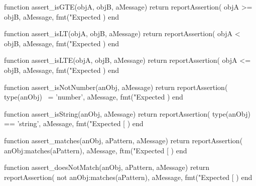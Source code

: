 \startTestSuite[title=assert_isGTE]

\startLuaCode
function assert_isGTE(objA, objB, aMessage)
  return reportAssertion(
    objA >= objB,
    aMessage,
    fmt("Expected %
  )
end
\stopLuaCode

\stopTestSuite

\startTestSuite[title=assert_isLT]

\startLuaCode
function assert_isLT(objA, objB, aMessage)
  return reportAssertion(
    objA < objB,
    aMessage,
    fmt("Expected %
  )
end
\stopLuaCode

\stopTestSuite

\startTestSuite[title=assert_isLTE]

\startLuaCode
function assert_isLTE(objA, objB, aMessage)
  return reportAssertion(
    objA <= objB,
    aMessage,
    fmt("Expected %
  )
end
\stopLuaCode


\stopTestSuite

\startTestSuite[title=assert_isNotNumber]

\startLuaCode
function assert_isNotNumber(anObj, aMessage)
  return reportAssertion(
    type(anObj) ~= 'number',
    aMessage,
    fmt("Expected %
  )
end
\stopLuaCode

\stopTestSuite

\startTestSuite[title=assert_isString]

\startLuaCode
function assert_isString(anObj, aMessage)
  return reportAssertion(
    type(anObj) == 'string',
    aMessage,
    fmt("Expected [%
  )
end
\stopLuaCode

\stopTestSuite

\startTestSuite[title=assert_matches]

\startLuaCode
function assert_matches(anObj, aPattern, aMessage)
  return reportAssertion(
    anObj:matches(aPattern),
    aMessage,
    ftm("Expected [%
  )
end
\stopLuaCode

\stopTestSuite

\startTestSuite[title=assert_doesNotMatch]

\startLuaCode
function assert_doesNotMatch(anObj, aPattern, aMessage)
  return reportAssertion(
    not anObj:matches(aPattern),
    aMessage,
    fmt("Expected [%
  )
end
\stopLuaCode

\stopTestSuite

